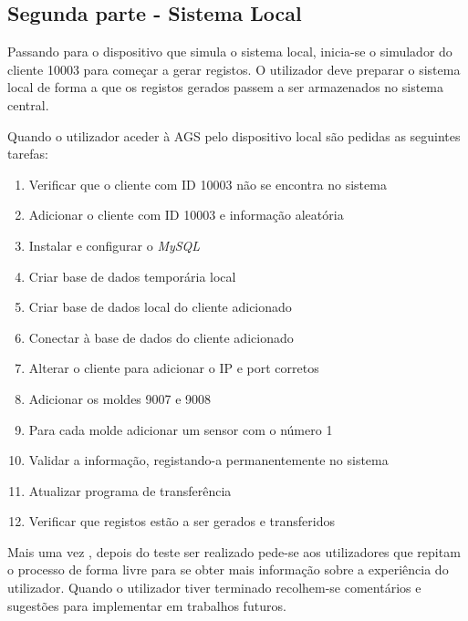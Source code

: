 \documentclass[11pt,twoside,a4paper]{report}
\begin{document}
\subsection{Segunda parte - Sistema Local}
Passando para o dispositivo que simula o sistema local, inicia-se o simulador do cliente 10003 para começar a gerar registos. O utilizador deve preparar o sistema local de forma a que os registos gerados passem a ser armazenados no sistema central.\par 
Quando o utilizador aceder à AGS pelo dispositivo local são pedidas as seguintes tarefas:
\begin{enumerate}
	\item Verificar que o cliente com ID 10003 não se encontra no sistema
	\item Adicionar o cliente com ID 10003 e informação aleatória
	\item Instalar e configurar o \textit{MySQL}
	\item Criar base de dados temporária local
	\item Criar base de dados local do cliente adicionado
	\item Conectar à base de dados do cliente adicionado
	\item Alterar o cliente para adicionar o IP e port corretos
	\item Adicionar os moldes 9007 e 9008
	\item Para cada molde adicionar um sensor com o número 1
	\item Validar a informação, registando-a permanentemente no sistema
	\item Atualizar programa de transferência
	\item Verificar que registos estão a ser gerados e transferidos
\end{enumerate}
Mais uma vez , depois do teste ser realizado pede-se aos utilizadores que repitam o processo de forma livre para se obter mais informação sobre a experiência do utilizador. Quando o utilizador tiver terminado recolhem-se comentários e sugestões para implementar em trabalhos futuros.
\end{document}

